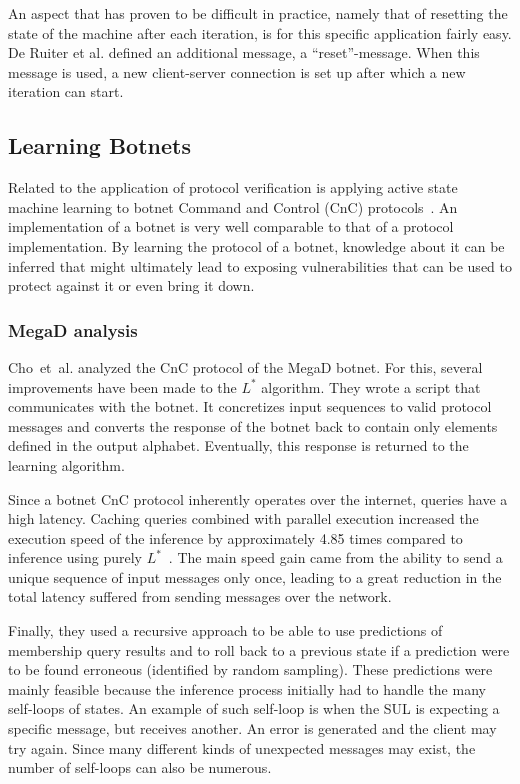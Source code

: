 An aspect that has proven to be difficult in practice, namely
that of resetting the state of the machine after each iteration, is for this
specific application fairly easy. De Ruiter et al. defined an additional
message, a ``reset''-message. When this message is used, a new client-server 
connection is set up after which a new iteration can start.

\subsection{Learning Botnets}
Related to the application of protocol verification is applying active state
machine learning to botnet Command and Control (CnC) protocols~\cite{Cho2010}.
An implementation of a botnet is very well comparable to that of a protocol
implementation. By learning the protocol of a botnet, knowledge about it
can be inferred that might ultimately lead to exposing vulnerabilities
that can be used to protect against it or even bring it down.

\subsubsection{MegaD analysis}
Cho~et~al. analyzed the CnC protocol of the MegaD botnet.
For this, several improvements have been made to the $L^*$ algorithm.
They wrote a script that communicates with the botnet. It concretizes input
sequences to valid protocol messages and converts the response of the botnet
back to contain only elements defined in the output alphabet. Eventually, this
response is returned to the learning algorithm.

Since a botnet CnC protocol inherently operates over the internet, queries have
a high latency. Caching queries combined with parallel execution increased the execution speed
of the inference by approximately 4.85 times compared to inference using purely
$L^*$~\cite{Cho2010}. The main speed gain came from the ability to send
a unique sequence of input messages only once, leading to a great reduction in
the total latency suffered from sending messages over the network.

Finally, they used a recursive approach to be able to use predictions of
membership query results and to roll back to a previous state if a prediction
were to be found erroneous (identified by random sampling). These predictions
were mainly feasible because the inference process initially had to handle the
many self-loops of states. An example of such self-loop is when the SUL is
expecting a specific message, but receives another. An error is generated and
the client may try again. Since many different kinds of unexpected messages may
exist, the number of self-loops can also be numerous.


